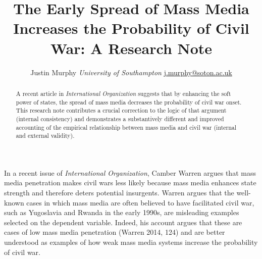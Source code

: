 \documentclass[11pt,article,oneside]{memoir}
\title{The Early Spread of Mass Media Increases the Probability of Civil War: A
Research Note}
\author{\Large Justin Murphy\vspace{0.05in} \newline\normalsize\emph{University of Southampton} \newline\footnotesize \url{j.murphy@soton.ac.uk}\vspace*{0.2in}\newline }
\date{}
\begin{document}
  
\setsansfont[Mapping=tex-text]{Gill Sans} 
\setmonofont[Mapping=tex-text,Scale=0.8]{Consolas}
\pagestyle{kjh}

\singlespacing


\maketitle



\vspace{-4ex}
\begin{abstract}

\noindent A recent article in \emph{International Organization} suggests that by
enhancing the soft power of states, the spread of mass media decreases
the probability of civil war onset. This research note contributes a
crucial correction to the logic of that argument (internal consistency)
and demonstrates a substantively different and improved accounting of
the empirical relationship between mass media and civil war (internal
and external validity).

\end{abstract}

\newpage


In a recent issue of \emph{International Organization}, Camber Warren
argues that mass media penetration makes civil wars less likely because
mass media enhances state strength and therefore deters potential
insurgents. Warren argues that the well-known cases in which mass media
are often believed to have facilitated civil war, such as Yugoslavia and
Rwanda in the early 1990s, are misleading examples selected on the
dependent variable. Indeed, his account argues that these are cases of
low mass media penetration (Warren 2014, 124) and are better understood
as examples of how weak mass media systems increase the probability of
civil war.
\end{document}
